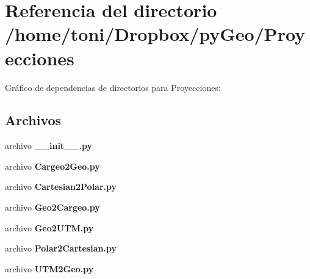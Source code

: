 \section{Referencia del directorio /home/toni/\-Dropbox/py\-Geo/\-Proyecciones}
\label{dir_c768a26906ed4ea409acba666cb16bfa}
Gráfico de dependencias de directorios para Proyecciones\-:
\subsection*{Archivos}
\begin{DoxyCompactItemize}
\item 
archivo {\bf \-\_\-\-\_\-init\-\_\-\-\_\-.\-py}
\item 
archivo {\bf Cargeo2\-Geo.\-py}
\item 
archivo {\bf Cartesian2\-Polar.\-py}
\item 
archivo {\bf Geo2\-Cargeo.\-py}
\item 
archivo {\bf Geo2\-U\-T\-M.\-py}
\item 
archivo {\bf Polar2\-Cartesian.\-py}
\item 
archivo {\bf U\-T\-M2\-Geo.\-py}
\end{DoxyCompactItemize}
